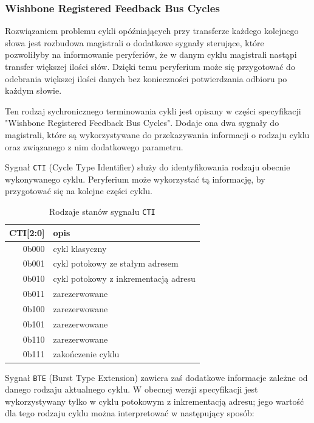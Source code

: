 \subsubsection{Wishbone Registered Feedback Bus Cycles}

Rozwiązaniem problemu cykli opóźniających przy transferze każdego kolejnego słowa jest rozbudowa magistrali o dodatkowe sygnały sterujące, które pozwoliłyby na informowanie peryferiów, że w danym cyklu magistrali nastąpi transfer większej ilości słów. Dzięki temu peryferium może się przygotować do odebrania większej ilości danych bez konieczności potwierdzania odbioru po każdym słowie.

Ten rodzaj sychronicznego terminowania cykli jest opisany w części specyfikacji "Wishbone Registered Feedback Bus Cycles". Dodaje ona dwa sygnały do magistrali, które są wykorzystywane do przekazywania informacji o rodzaju cyklu oraz związanego z nim dodatkowego parametru.

Sygnał \texttt{CTI} (Cycle Type Identifier) służy do identyfikowania rodzaju obecnie wykonywanego cyklu. Peryferium może wykorzystać tą informację, by przygotować się na kolejne części cyklu.
\begin{table}[H]
\begin{center}
\begin{tabular}{ r|l }
 CTI[2:0] & opis \\ 
 \hline
 0b000 & cykl klasyczny \\
 0b001 & cykl potokowy ze stałym adresem \\
 0b010 & cykl potokowy z inkrementacją adresu \\
 0b011 & zarezerwowane \\
 0b100 & zarezerwowane \\
 0b101 & zarezerwowane \\
 0b110 & zarezerwowane \\
 0b111 & zakończenie cyklu \\
 \hline
\end{tabular}
\end{center}
\caption{\label{tab:signal-states-cti}Rodzaje stanów sygnału \texttt{CTI}}
\end{table}

Sygnał \texttt{BTE} (Burst Type Extension) zawiera zaś dodatkowe informacje zależne od danego rodzaju aktualnego cyklu.
W obecnej wersji specyfikacji jest wykorzystywany tylko w cyklu potokowym z inkrementacją adresu; jego wartość dla tego rodzaju cyklu można interpretować w następujący sposób:

